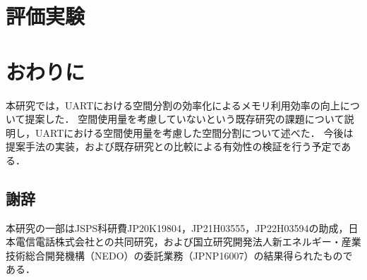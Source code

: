 \chapter{評価実験}






\chapter{おわりに}

本研究では，UARTにおける空間分割の効率化によるメモリ利用効率の向上について提案した．
空間使用量を考慮していないという既存研究の課題について説明し，UARTにおける空間使用量を考慮した空間分割について述べた．
今後は提案手法の実装，および既存研究との比較による有効性の検証を行う予定である．





\section*{謝辞}

本研究の一部はJSPS科研費JP20K19804，JP21H03555，JP22H03594の助成，日本電信電話株式会社との共同研究，および国立研究開発法人新エネルギー・産業技術総合開発機構（NEDO）の委託業務（JPNP16007）の結果得られたものである．